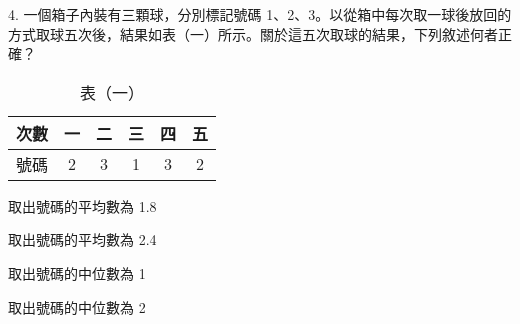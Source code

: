 \documentclass[12pt]{article}
\begin{document}
\begin{problem}
  \item[4.] 一個箱子內裝有三顆球，分別標記號碼 1、2、3。以從箱中每次取一球後放回的方式取球五次後，結果如表（一）所示。關於這五次取球的結果，下列敘述何者正確？
  \begin{table}[ht]
    \centering
    \renewcommand{\arraystretch}{1.2}
    \vspace*{-1ex}
    \caption*{表（一）}
    \vspace*{-1ex}
    \begin{tabular}{|c|c|c|c|c|c|}
      \hline
      次數 & 一 & 二 & 三 & 四 & 五 \\ \hline
      號碼 & 2 & 3 & 1 & 3 & 2 \\ \hline
    \end{tabular}
    \vspace*{-2ex}
  \end{table}
  \begin{choices}
    \item 取出號碼的平均數為 1.8
    \item 取出號碼的平均數為 2.4
    \item 取出號碼的中位數為 1
    \item 取出號碼的中位數為 2
  \end{choices}
\end{problem}
\end{document}
